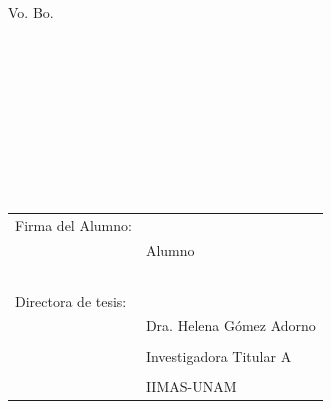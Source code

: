\documentclass{article}
\begin{document}
\clearpage
\vfill
\Large{Vo. Bo.}
\\    \\    \\    \\    \\  \\    \\    \\    \\    \\   
 
\begin{tabular}{@{}p{6cm}p{7cm}@{}}
    \Large{Firma del Alumno:} & \hrulefill \\
                         & \large{Alumno} \par \\
    \\    \\    \\    \\    \\    
    \Large{Directora de tesis:} & \hrulefill \\
                         & \large{Dra. Helena Gómez Adorno} \\
    \Large{} & \\
                         & \large{Investigadora Titular A} \\
    \Large{} &  \\
                         & \large{IIMAS-UNAM} \\
    
\end{tabular}
\end{document}
